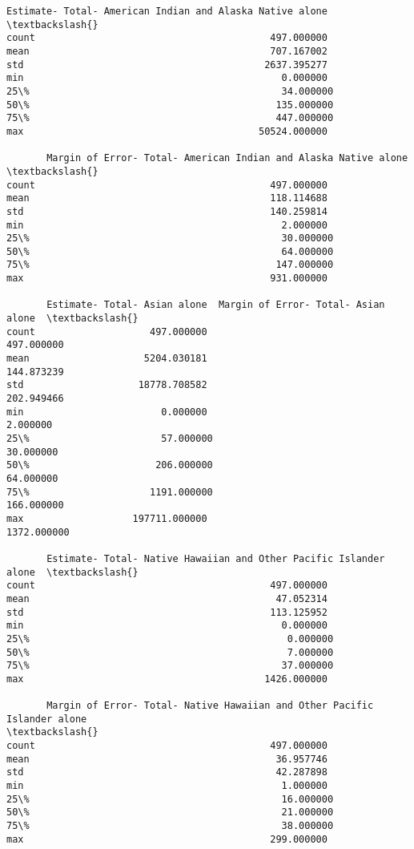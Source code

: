 \documentclass[11pt]{article}
\begin{document}
\begin{tcolorbox}[breakable, size=fbox, boxrule=.5pt, pad at break*=1mm, opacityfill=0]
\begin{Verbatim}[commandchars=\\\{\}]
       Estimate- Total- American Indian and Alaska Native alone  \textbackslash{}
count                                         497.000000
mean                                          707.167002
std                                          2637.395277
min                                             0.000000
25\%                                            34.000000
50\%                                           135.000000
75\%                                           447.000000
max                                         50524.000000

       Margin of Error- Total- American Indian and Alaska Native alone  \textbackslash{}
count                                         497.000000
mean                                          118.114688
std                                           140.259814
min                                             2.000000
25\%                                            30.000000
50\%                                            64.000000
75\%                                           147.000000
max                                           931.000000

       Estimate- Total- Asian alone  Margin of Error- Total- Asian alone  \textbackslash{}
count                    497.000000                           497.000000
mean                    5204.030181                           144.873239
std                    18778.708582                           202.949466
min                        0.000000                             2.000000
25\%                       57.000000                            30.000000
50\%                      206.000000                            64.000000
75\%                     1191.000000                           166.000000
max                   197711.000000                          1372.000000

       Estimate- Total- Native Hawaiian and Other Pacific Islander alone  \textbackslash{}
count                                         497.000000
mean                                           47.052314
std                                           113.125952
min                                             0.000000
25\%                                             0.000000
50\%                                             7.000000
75\%                                            37.000000
max                                          1426.000000

       Margin of Error- Total- Native Hawaiian and Other Pacific Islander alone
\textbackslash{}
count                                         497.000000
mean                                           36.957746
std                                            42.287898
min                                             1.000000
25\%                                            16.000000
50\%                                            21.000000
75\%                                            38.000000
max                                           299.000000


\end{Verbatim}
\end{tcolorbox}
\end{document}
